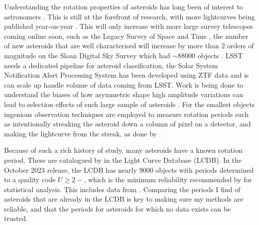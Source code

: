 \documentclass[12pt]{article}
\begin{document}
Understanding the rotation properties of asteroids has long been of interest to astronomers \citep[e.g.][for early work into the limits of rotation period and the tumbling nature of some small bodies]{Weidenschilling1981,Harris1994}. 
This is still at the forefront of research, with more lightcurves being published year-on-year \citep{Harris2015}. 
This will only increase with more large survey telescopes coming online soon, such as the Legacy Survey of Space and Time \citep[LSST][]{LSST2019}, the number of new asteroids that are well characterised will increase by more than 2 orders of magnitude on the Sloan Digital Sky Survey \citep[SDSS][]{York2000} which had $\sim 88000$ objects \citet{Parker2008}. 
LSST needs a dedicated pipeline for asteroid classification, the Solar System Notification Alert Processing System \citep[SNAPS][]{Trilling2023} has been developed using ZTF data and is can scale up handle volume of data coming from LSST.
Work is being done to understand the biases of how  asymmetric shape high amplitude variations can lead to selection effects of such large sample of asteroids \citet{Levine2023}.
For the smallest objects ingenious observation techniques are employed to measure rotation periods such as intentionally streaking the asteroid down a column of pixel on a detector, and making the lightcurve from the streak, as done by \citet{Bolin2023}. 

Because of such a rich history of study, many asteroids have a known rotation period. 
These are catalogued by \citet{Warner2009} %
in the Light Curve Database (LCDB).
In the October  2023 release, the LCDB has nearly 9000 objects with periods determined to a quality code $U\geq 2-$, which is the minimum reliability recommended by \citeauthor{Warner2009} for statistical analysis.
This includes data from \citet{Pal2020}.
Comparing the periods I find of asteroids that are already in the LCDB is key to making sure my methods are reliable, and that the periods for asteroids for which no data exists can be trusted.
\end{document}
